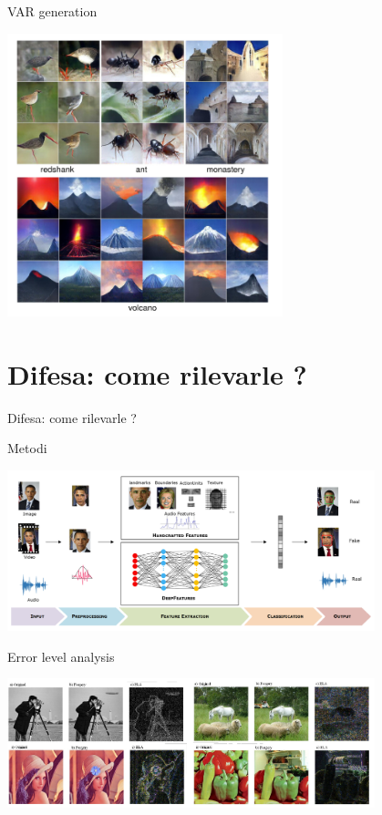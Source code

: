 \documentclass[11pt]{beamer}
\begin{document}
\begin{frame}{VAR generation \cite{nguyen2017plug}}
\begin{center}
\includegraphics[width=0.6\textwidth]{Pic/GAN_example.png}
\end{center}
\end{frame}


\section{Difesa: come rilevarle ?}

\begin{frame}
\begin{center}
\Huge
Difesa: come rilevarle ?
\end{center}
\end{frame}

\begin{frame}{Metodi \cite{masood2023deepfakes}}
\begin{center}
\includegraphics[width=0.8\textwidth]{Pic/deepfake_detection.png}
\end{center}
\end{frame}


\begin{frame}{Error level analysis \cite{jeronymo2017image}}
\begin{center}
\includegraphics[width=0.8\textwidth]{Pic/ELA_FULL.png}
\end{center}
\end{frame}
\end{document}
